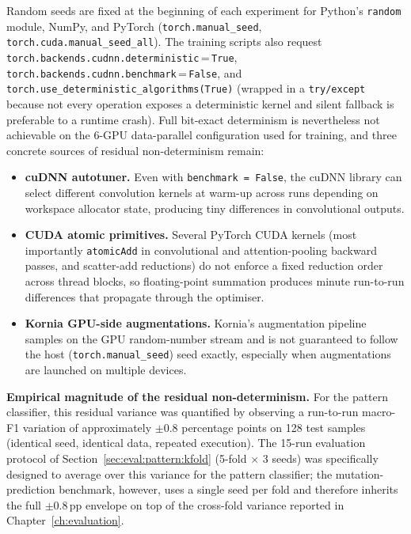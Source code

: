 Random seeds are fixed at the beginning of each experiment for
Python's \texttt{random} module, NumPy, and PyTorch
(\texttt{torch.manual\_seed}, \texttt{torch.cuda.manual\_seed\_all}).
The training scripts also request
\texttt{torch.backends.cudnn.deterministic}\,=\,\texttt{True},
\texttt{torch.backends.cudnn.benchmark}\,=\,\texttt{False}, and
\texttt{torch.use\_deterministic\_\allowbreak algorithms(True)}
(wrapped in a \texttt{try/except} because not every operation exposes
a deterministic kernel and silent fallback is preferable to a runtime
crash).
Full bit-exact determinism is nevertheless not achievable on the
6-GPU data-parallel configuration used for training, and three
concrete sources of residual non-determinism remain:
\begin{itemize}
  \item \textbf{cuDNN autotuner.}
        Even with \texttt{benchmark = False}, the cuDNN library can
        select different convolution kernels at warm-up across
        runs depending on workspace allocator state, producing tiny
        differences in convolutional outputs.
  \item \textbf{CUDA atomic primitives.}
        Several PyTorch CUDA kernels (most importantly
        \texttt{atomicAdd} in convolutional and attention-pooling
        backward passes, and scatter-add reductions) do not enforce
        a fixed reduction order across thread blocks, so
        floating-point summation produces minute run-to-run
        differences that propagate through the optimiser.
  \item \textbf{Kornia GPU-side augmentations.}
        Kornia's augmentation pipeline samples on the GPU
        random-number stream and is not guaranteed to follow the
        host (\texttt{torch.manual\_seed}) seed exactly, especially
        when augmentations are launched on multiple devices.
\end{itemize}

\textbf{Empirical magnitude of the residual non-determinism.}
For the pattern classifier, this residual variance was quantified by
observing a run-to-run macro-F1 variation of approximately
$\pm 0.8$ percentage points on 128 test samples (identical seed,
identical data, repeated execution).
The 15-run evaluation protocol of
Section~\ref{sec:eval:pattern:kfold} (5-fold $\times$ 3 seeds) was
specifically designed to average over this variance for the pattern
classifier; the mutation-prediction benchmark, however, uses a single
seed per fold and therefore inherits the full $\pm 0.8$\,pp envelope
on top of the cross-fold variance reported in
Chapter~\ref{ch:evaluation}.

